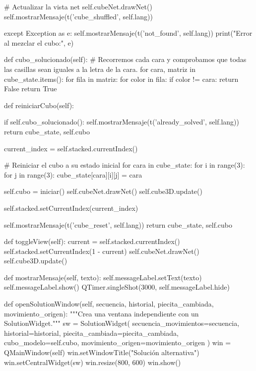             # Actualizar la vista net
            self.cubeNet.drawNet()
            self.mostrarMensaje(t('cube_shuffled', self.lang))
            
        except Exception as e:
            self.mostrarMensaje(t('not_found', self.lang))
            print("Error al mezclar el cubo:", e)
            
    def cubo_solucionado(self):
        # Recorremos cada cara y comprobamos que todas las casillas sean iguales a la letra de la cara.
        for cara, matriz in cube_state.items():
            for fila in matriz:
                for color in fila:
                    if color != cara:
                        return False
        return True
    
    def reiniciarCubo(self):
        
        if self.cubo_solucionado():
            self.mostrarMensaje(t('already_solved', self.lang))
            return cube_state, self.cubo
        
        current_index = self.stacked.currentIndex() 
        
        # Reiniciar el cubo a su estado inicial
        for cara in cube_state:
            for i in range(3):
                for j in range(3):
                    cube_state[cara][i][j] = cara
        
        self.cubo = iniciar()
        self.cubeNet.drawNet()
        self.cube3D.update()
        
        self.stacked.setCurrentIndex(current_index) 

        self.mostrarMensaje(t('cube_reset', self.lang))
        return cube_state, self.cubo

    def toggleView(self):
        current = self.stacked.currentIndex()
        self.stacked.setCurrentIndex(1 - current)
        self.cubeNet.drawNet()
        self.cube3D.update()
    
    def mostrarMensaje(self, texto):
        self.messageLabel.setText(texto)
        self.messageLabel.show()
        QTimer.singleShot(3000, self.messageLabel.hide)
        
    def openSolutionWindow(self, secuencia, historial, piecita_cambiada, movimiento_origen):
        """Crea una ventana independiente con un SolutionWidget."""
        sw = SolutionWidget(
            secuencia_movimientos=secuencia,
            historial=historial,
            piecita_cambiada=piecita_cambiada,
            cubo_modelo=self.cubo,
            movimiento_origen=movimiento_origen
        )
        win = QMainWindow(self)
        win.setWindowTitle("Solución alternativa")
        win.setCentralWidget(sw)
        win.resize(800, 600)
        win.show()

